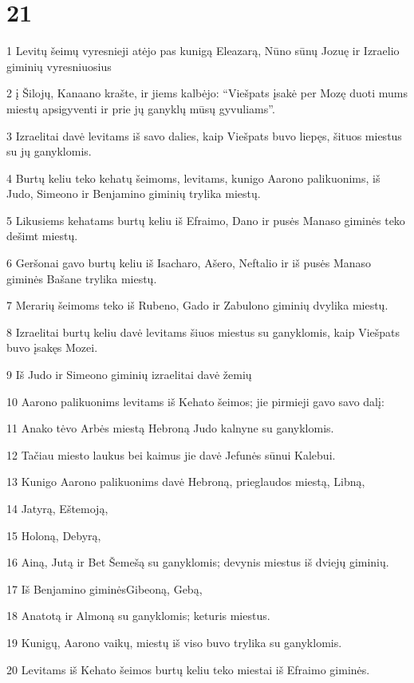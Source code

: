 \chapter{21}

\par 1 Levitų šeimų vyresnieji atėjo pas kunigą Eleazarą, Nūno sūnų Jozuę ir Izraelio giminių vyresniuosius 
\par 2 į Šilojų, Kanaano krašte, ir jiems kalbėjo: “Viešpats įsakė per Mozę duoti mums miestų apsigyventi ir prie jų ganyklų mūsų gyvuliams”. 
\par 3 Izraelitai davė levitams iš savo dalies, kaip Viešpats buvo liepęs, šituos miestus su jų ganyklomis. 
\par 4 Burtų keliu teko kehatų šeimoms, levitams, kunigo Aarono palikuonims, iš Judo, Simeono ir Benjamino giminių trylika miestų. 
\par 5 Likusiems kehatams burtų keliu iš Efraimo, Dano ir pusės Manaso giminės teko dešimt miestų. 
\par 6 Geršonai gavo burtų keliu iš Isacharo, Ašero, Neftalio ir iš pusės Manaso giminės Bašane trylika miestų. 
\par 7 Merarių šeimoms teko iš Rubeno, Gado ir Zabulono giminių dvylika miestų. 
\par 8 Izraelitai burtų keliu davė levitams šiuos miestus su ganyklomis, kaip Viešpats buvo įsakęs Mozei. 
\par 9 Iš Judo ir Simeono giminių izraelitai davė žemių 
\par 10 Aarono palikuonims levitams iš Kehato šeimos; jie pirmieji gavo savo dalį: 
\par 11 Anako tėvo Arbės miestą Hebroną Judo kalnyne su ganyklomis. 
\par 12 Tačiau miesto laukus bei kaimus jie davė Jefunės sūnui Kalebui. 
\par 13 Kunigo Aarono palikuonims davė Hebroną, prieglaudos miestą, Libną, 
\par 14 Jatyrą, Eštemoją, 
\par 15 Holoną, Debyrą, 
\par 16 Ainą, Jutą ir Bet Šemešą su ganyklomis; devynis miestus iš dviejų giminių. 
\par 17 Iš Benjamino giminės­Gibeoną, Gebą, 
\par 18 Anatotą ir Almoną su ganyklomis; keturis miestus. 
\par 19 Kunigų, Aarono vaikų, miestų iš viso buvo trylika su ganyklomis. 
\par 20 Levitams iš Kehato šeimos burtų keliu teko miestai iš Efraimo giminės. 
